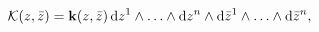 \begin{equation}
{\cal K}(z,\bar z)={\bf k}(z, \bar z)\,{\rm d}z^1\wedge\ldots\wedge{\rm d}z^n\wedge{\rm d}\bar 
z^1\wedge\ldots\wedge{\rm d}\bar z^n,
\label{kicco}
\end{equation}

